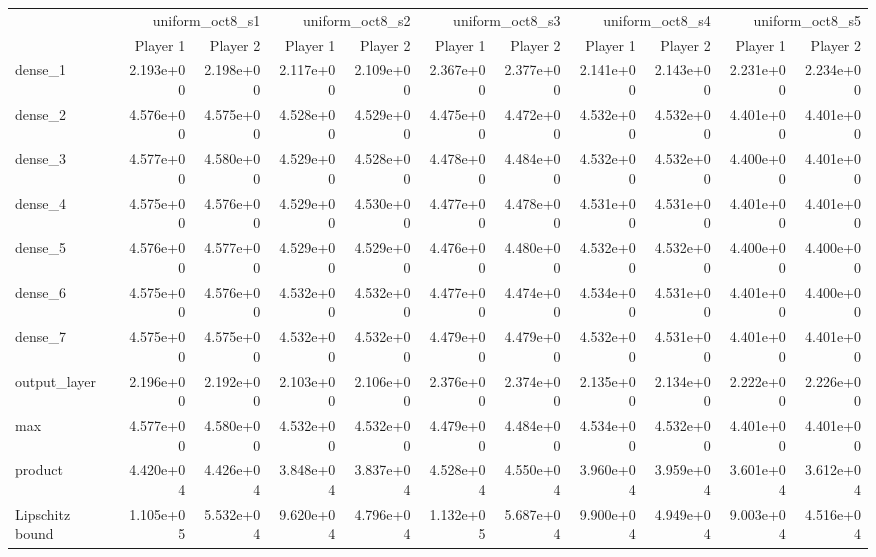 \begin{tabular}{lrrrrrrrrrr}
\toprule
 & \multicolumn{2}{r}{uniform\_oct8\_s1} & \multicolumn{2}{r}{uniform\_oct8\_s2} & \multicolumn{2}{r}{uniform\_oct8\_s3} & \multicolumn{2}{r}{uniform\_oct8\_s4} & \multicolumn{2}{r}{uniform\_oct8\_s5} \\
 & Player 1 & Player 2 & Player 1 & Player 2 & Player 1 & Player 2 & Player 1 & Player 2 & Player 1 & Player 2 \\
\midrule
dense\_1 & 2.193e+00 & 2.198e+00 & 2.117e+00 & 2.109e+00 & 2.367e+00 & 2.377e+00 & 2.141e+00 & 2.143e+00 & 2.231e+00 & 2.234e+00 \\
dense\_2 & 4.576e+00 & 4.575e+00 & 4.528e+00 & 4.529e+00 & 4.475e+00 & 4.472e+00 & 4.532e+00 & 4.532e+00 & 4.401e+00 & 4.401e+00 \\
dense\_3 & 4.577e+00 & 4.580e+00 & 4.529e+00 & 4.528e+00 & 4.478e+00 & 4.484e+00 & 4.532e+00 & 4.532e+00 & 4.400e+00 & 4.401e+00 \\
dense\_4 & 4.575e+00 & 4.576e+00 & 4.529e+00 & 4.530e+00 & 4.477e+00 & 4.478e+00 & 4.531e+00 & 4.531e+00 & 4.401e+00 & 4.401e+00 \\
dense\_5 & 4.576e+00 & 4.577e+00 & 4.529e+00 & 4.529e+00 & 4.476e+00 & 4.480e+00 & 4.532e+00 & 4.532e+00 & 4.400e+00 & 4.400e+00 \\
dense\_6 & 4.575e+00 & 4.576e+00 & 4.532e+00 & 4.532e+00 & 4.477e+00 & 4.474e+00 & 4.534e+00 & 4.531e+00 & 4.401e+00 & 4.400e+00 \\
dense\_7 & 4.575e+00 & 4.575e+00 & 4.532e+00 & 4.532e+00 & 4.479e+00 & 4.479e+00 & 4.532e+00 & 4.531e+00 & 4.401e+00 & 4.401e+00 \\
output\_layer & 2.196e+00 & 2.192e+00 & 2.103e+00 & 2.106e+00 & 2.376e+00 & 2.374e+00 & 2.135e+00 & 2.134e+00 & 2.222e+00 & 2.226e+00 \\
max & 4.577e+00 & 4.580e+00 & 4.532e+00 & 4.532e+00 & 4.479e+00 & 4.484e+00 & 4.534e+00 & 4.532e+00 & 4.401e+00 & 4.401e+00 \\
product & 4.420e+04 & 4.426e+04 & 3.848e+04 & 3.837e+04 & 4.528e+04 & 4.550e+04 & 3.960e+04 & 3.959e+04 & 3.601e+04 & 3.612e+04 \\
Lipschitz bound & 1.105e+05 & 5.532e+04 & 9.620e+04 & 4.796e+04 & 1.132e+05 & 5.687e+04 & 9.900e+04 & 4.949e+04 & 9.003e+04 & 4.516e+04 \\
\bottomrule
\end{tabular}

